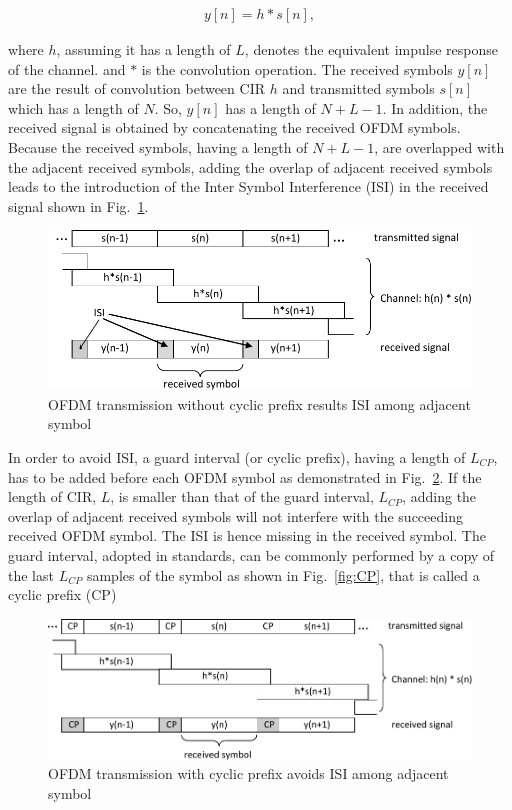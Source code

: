 \begin{eqnarray}
\label{equ:sampledOFDMsignal}
y[n] = h*s[n],
\end{eqnarray} 

where $h$, assuming it has a length of $L$, denotes the equivalent impulse response of the channel. and $*$ is the convolution operation. 
The received symbols $y[n]$ are the result of convolution between CIR $h$ and transmitted symbols $s[n]$ which has a length of $N$.
So,  $y[n]$ has a length of $N+L-1$.
In addition, the received signal is obtained by concatenating the received OFDM symbols. 
Because the received symbols, having a length of $N+L-1$, are overlapped with the adjacent received symbols, adding the overlap of adjacent received symbols leads to the introduction of the Inter Symbol Interference (ISI) in the received signal shown in Fig.~\ref{fig:CIR-noCP}.


\begin{figure}
	\centerline{\includegraphics [width=0.8\columnwidth] {Figures/CIR_noCP.pdf} }
	\caption{OFDM transmission without cyclic prefix results ISI among adjacent symbol}
	\label{fig:CIR-noCP}
\end{figure}

In order to avoid ISI, a guard interval (or cyclic prefix), having a length of $L_{CP}$, has to be added before each OFDM symbol as demonstrated in Fig.~\ref{fig:CIR-CP}. 
If the length of CIR, $L$, is smaller than that of the guard interval, $L_{CP}$, adding the overlap of adjacent received symbols will not interfere with the succeeding received OFDM symbol. 
The ISI is hence missing in the received symbol.  
The guard interval, adopted in standards, can be commonly performed by a copy of the last $L_{CP}$ samples of the symbol as shown in Fig.~\ref{fig:CP}, that is called a cyclic prefix (CP)

\begin{figure}
	\centerline{\includegraphics [width=0.8\columnwidth] {Figures/CIR_CP.pdf} }
	\caption{OFDM transmission with cyclic prefix avoids ISI among adjacent symbol}
	\label{fig:CIR-CP}
\end{figure}

